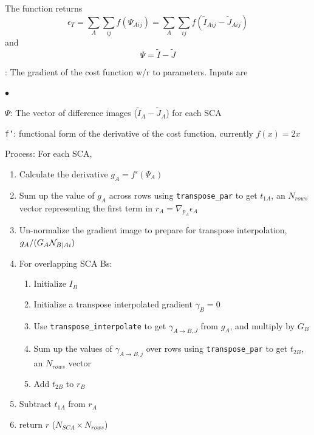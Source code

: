 \documentclass[12pt]{pasj01}
\begin{document}
The function returns
\begin{equation}
\epsilon_T = \sum_A\sum_{ij}f(\Psi_{Aij}) = \sum_A\sum_{ij}f(\tilde I_{Aij} - \tilde J_{Aij})
\end{equation}
and
\begin{equation}
    \Psi = \tilde I - \tilde J
\end{equation}



\vskip 0.05in

: The gradient of the cost function w/r to parameters. Inputs are
\begin{list}{$\bullet$}{}
\item {\tt $\Psi$}: The vector of difference images ($\tilde{I}_A-\tilde{J}_A$) for each SCA
\item {\tt f'}: functional form of the derivative of the cost function, currently $f(x)=2x$
\end{list}

Process: For each SCA,
\begin{enumerate}
    \item Calculate the derivative $g_A=f'(\Psi_A)$
    \item Sum up the value of $g_A$ across rows using {\tt transpose\_par} to get $t_{1A}$, an $N_{rows}$ vector representing the first term in $r_A = \nabla_{p_A}\epsilon_A$
    \item Un-normalize the gradient image to prepare for transpose interpolation, $g_A/(G_A{\cal N}_{B|Ai})$
    \item For overlapping SCA Bs:
    \begin{enumerate}
        \item Initialize $I_B$
        \item Initialize a transpose interpolated gradient $\gamma_B=0$
        \item Use {\tt transpose\_interpolate} to get $\gamma_{A\to B, J}$ from $g_A$, and multiply by $G_B$
        \item Sum up the values of $\gamma_{A\to B, j}$ over rows using {\tt transpose\_par} to get $t_{2B}$, an $N_{rows}$ vector
        \item Add $t_{2B}$ to $r_B$
    \end{enumerate}
    \item Subtract $t_{1A}$ from $r_A$
    \item return $r$ ($N_{SCA}\times N_{rows}$)
\end{enumerate}
\end{document}

